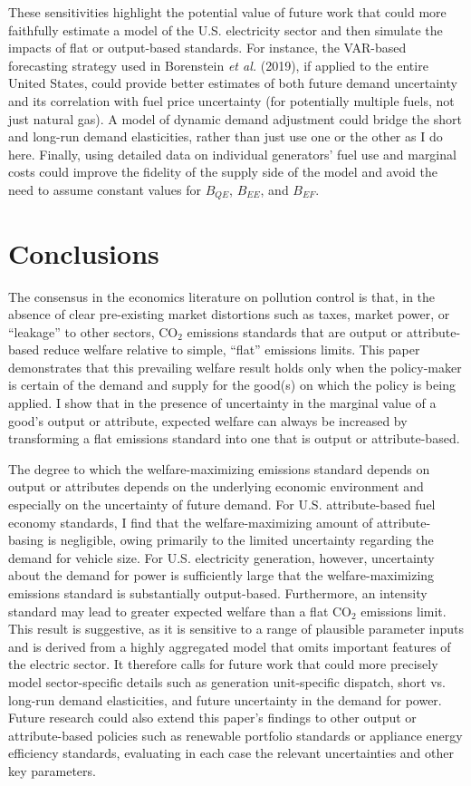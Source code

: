 \documentclass[12pt]{article}
\begin{document}
These sensitivities highlight the potential value of future work that could more faithfully estimate a model of the U.S. electricity sector and then simulate the impacts of flat or output-based standards. For instance, the VAR-based forecasting strategy used in Borenstein {\it et al.} (2019), if applied to the entire United States, could provide better estimates of both future demand uncertainty and its correlation with fuel price uncertainty (for potentially multiple fuels, not just natural gas). A model of dynamic demand adjustment could bridge the short and long-run demand elasticities, rather than just use one or the other as I do here. Finally, using detailed data on individual generators' fuel use and marginal costs could improve the fidelity of the supply side of the model and avoid the need to assume constant values for $B_{QE}$, $B_{EE}$, and $B_{EF}$.



\section{Conclusions} \label{sec:conclusions}

The consensus in the economics literature on pollution control is that, in the absence of clear pre-existing market distortions such as taxes, market power, or ``leakage'' to other sectors, CO$_2$ emissions standards that are output or attribute-based reduce welfare relative to simple, ``flat'' emissions limits. This paper demonstrates that this prevailing welfare result holds only when the policy-maker is certain of the demand and supply for the good(s) on which the policy is being applied. I show that in the presence of uncertainty in the marginal value of a good's output or attribute, expected welfare can always be increased by transforming a flat emissions standard into one that is output or attribute-based.

The degree to which the welfare-maximizing emissions standard depends on output or attributes depends on the underlying economic environment and especially on the uncertainty of future demand. For U.S. attribute-based fuel economy standards, I find that the welfare-maximizing amount of attribute-basing is negligible, owing primarily to the limited uncertainty regarding the demand for vehicle size. For U.S. electricity generation, however, uncertainty about the demand for power is sufficiently large that the welfare-maximizing emissions standard is substantially output-based. Furthermore, an intensity standard may lead to greater expected welfare than a flat CO$_2$ emissions limit. This result is suggestive, as it is sensitive to a range of plausible parameter inputs and is derived from a highly aggregated model that omits important features of the electric sector. It therefore calls for future work that could more precisely model sector-specific details such as generation unit-specific dispatch, short vs. long-run demand elasticities, and future uncertainty in the demand for power. Future research could also extend this paper's findings to other output or attribute-based policies such as renewable portfolio standards or appliance energy efficiency standards, evaluating in each case the relevant uncertainties and other key parameters.
\end{document}
